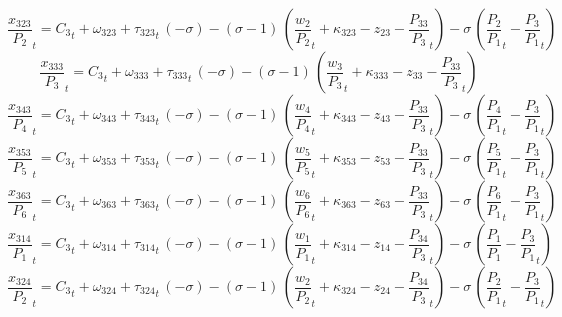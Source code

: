 \begin{dmath}
{{\frac{x_{323}}{P_{2}}}}_{t}={{C_{3}}}_{t}+{{\omega_{323}}}+{{\tau_{323}}}_{t}\, \left(-{{\sigma}}\right)-\left({{\sigma}}-1\right)\, \left({{\frac{w_{2}}{P_{2}}}}_{t}+{{\kappa_{323}}}-{{z_{23}}}-{{\frac{P_{33}}{P_{3}}}}_{t}\right)-{{\sigma}}\, \left({{\frac{P_{2}}{P_{1}}}}_{t}-{{\frac{P_{3}}{P_{1}}}}_{t}\right)
\end{dmath}
\begin{dmath}
{{\frac{x_{333}}{P_{3}}}}_{t}={{C_{3}}}_{t}+{{\omega_{333}}}+{{\tau_{333}}}_{t}\, \left(-{{\sigma}}\right)-\left({{\sigma}}-1\right)\, \left({{\frac{w_{3}}{P_{3}}}}_{t}+{{\kappa_{333}}}-{{z_{33}}}-{{\frac{P_{33}}{P_{3}}}}_{t}\right)
\end{dmath}
\begin{dmath}
{{\frac{x_{343}}{P_{4}}}}_{t}={{C_{3}}}_{t}+{{\omega_{343}}}+{{\tau_{343}}}_{t}\, \left(-{{\sigma}}\right)-\left({{\sigma}}-1\right)\, \left({{\frac{w_{4}}{P_{4}}}}_{t}+{{\kappa_{343}}}-{{z_{43}}}-{{\frac{P_{33}}{P_{3}}}}_{t}\right)-{{\sigma}}\, \left({{\frac{P_{4}}{P_{1}}}}_{t}-{{\frac{P_{3}}{P_{1}}}}_{t}\right)
\end{dmath}
\begin{dmath}
{{\frac{x_{353}}{P_{5}}}}_{t}={{C_{3}}}_{t}+{{\omega_{353}}}+{{\tau_{353}}}_{t}\, \left(-{{\sigma}}\right)-\left({{\sigma}}-1\right)\, \left({{\frac{w_{5}}{P_{5}}}}_{t}+{{\kappa_{353}}}-{{z_{53}}}-{{\frac{P_{33}}{P_{3}}}}_{t}\right)-{{\sigma}}\, \left({{\frac{P_{5}}{P_{1}}}}_{t}-{{\frac{P_{3}}{P_{1}}}}_{t}\right)
\end{dmath}
\begin{dmath}
{{\frac{x_{363}}{P_{6}}}}_{t}={{C_{3}}}_{t}+{{\omega_{363}}}+{{\tau_{363}}}_{t}\, \left(-{{\sigma}}\right)-\left({{\sigma}}-1\right)\, \left({{\frac{w_{6}}{P_{6}}}}_{t}+{{\kappa_{363}}}-{{z_{63}}}-{{\frac{P_{33}}{P_{3}}}}_{t}\right)-{{\sigma}}\, \left({{\frac{P_{6}}{P_{1}}}}_{t}-{{\frac{P_{3}}{P_{1}}}}_{t}\right)
\end{dmath}
\begin{dmath}
{{\frac{x_{314}}{P_{1}}}}_{t}={{C_{3}}}_{t}+{{\omega_{314}}}+{{\tau_{314}}}_{t}\, \left(-{{\sigma}}\right)-\left({{\sigma}}-1\right)\, \left({{\frac{w_{1}}{P_{1}}}}_{t}+{{\kappa_{314}}}-{{z_{14}}}-{{\frac{P_{34}}{P_{3}}}}_{t}\right)-{{\sigma}}\, \left({{\frac{P_{1}}{P_{1}}}}-{{\frac{P_{3}}{P_{1}}}}_{t}\right)
\end{dmath}
\begin{dmath}
{{\frac{x_{324}}{P_{2}}}}_{t}={{C_{3}}}_{t}+{{\omega_{324}}}+{{\tau_{324}}}_{t}\, \left(-{{\sigma}}\right)-\left({{\sigma}}-1\right)\, \left({{\frac{w_{2}}{P_{2}}}}_{t}+{{\kappa_{324}}}-{{z_{24}}}-{{\frac{P_{34}}{P_{3}}}}_{t}\right)-{{\sigma}}\, \left({{\frac{P_{2}}{P_{1}}}}_{t}-{{\frac{P_{3}}{P_{1}}}}_{t}\right)
\end{dmath}
